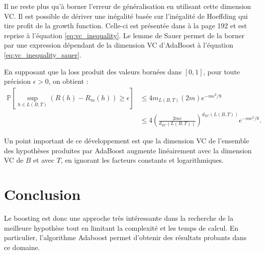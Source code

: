 \documentclass[12pt]{article}
\begin{document}
	Il ne reste plus qu'à borner l'erreur de généralisation en utilisant cette dimension VC.
	Il est possible de dériver une inégalité basée sur l'inégalité de Hoeffding qui tire profit de la growth function.
	Celle-ci est présentée dans \cite{Bousquet2003-oz} à la page 192 et est reprise à l'équation \ref{eq:vc_inequality}.
	Le lemme de Sauer permet de la borner par une expression dépendant de la dimension VC d'AdaBoost à l'équation \ref{eq:vc_inequality_sauer}.
	
	En supposant que la loss produit des valeurs bornées dans $[0, 1]$, pour toute précision $\epsilon > 0$, on obtient :
	\begin{align}
	\mathbb{P}\left[ \sup_{h \in L(B, T)} (R(h) - R_m(h)) \geq \epsilon \right] &\leq 4 m_{L(B, T)}(2 m) e^{-m \epsilon^2 / 8} \label{eq:vc_inequality} \\
	&\leq 4 \left( \frac{2 m e}{d_{VC}(L(B, T))} \right)^{d_{VC}(L(B, T))} e^{-m \epsilon^2 / 8}. \label{eq:vc_inequality_sauer}
	\end{align}

	Un point important de ce développement est que la dimension VC de l'ensemble des hypothèses produites par AdaBoost augmente linéairement avec la dimension VC de $B$ et avec $T$, en ignorant les facteurs constants et logarithmiques.
	
	\section{Conclusion}
	
	Le boosting est donc une approche très intéressante dans la recherche de la meilleure hypothèse tout en limitant la complexité et les temps de calcul. En particulier, l'algorithme Adaboost permet d'obtenir des résultats probants dans ce domaine. 	
	
	
	
	
\end{document}
